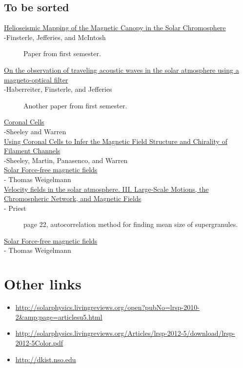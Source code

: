 \documentclass{article}
\begin{document}
\subsection{To be sorted}
\begin{description}
    \item [\href{http://adsabs.harvard.edu/abs/2004ApJ...613L.185F}
            {Helioseismic Mapping of the Magnetic Canopy in the Solar Chromosphere}\\
        -Finsterle, Jefferies, and McIntosh]
        Paper from first semester.
    \item [\href{http://cdsads.u-strasbg.fr/abs/2007AN....328..211H}
        {On the observation of traveling acoustic waves in the solar
            atmosphere using a magneto-optical filter}\\
        -Haberreiter, Finsterle, and Jefferies]
        Another paper from first semester.
	\item [\href{http://cdsads.u-strasbg.fr/abs/2012ApJ...749...40S}
        {Coronal Cells}\\
        -Sheeley and Warren]
	\item [\href{http://cdsads.u-strasbg.fr/abs/2013ApJ...772...88S}
        {Using Coronal Cells to Infer the Magnetic Field Structure and
            Chirality of Filament Channels}\\
        -Sheeley, Martin, Panasenco, and Warren]
    \item [\href{https://arxiv.org/abs/1208.4693}
        {Solar Force-free magnetic fields}\\
        - Thomas Weigelmann]
    \item [\href{http://cdsads.u-strasbg.fr/abs/1964ApJ...140.1120S}
        {Velocity fields in the solar atmosphere. III.
        Large-Scale Motions, the Chromospheric Network, and Magnetic Fields}\\
        - Priest]
        page 22, autocorrelation method for finding mean size of supergranules.
    \item [\href{https://arxiv.org/abs/1208.4693}
        {Solar Force-free magnetic fields}\\
        - Thomas Weigelmann]
\end{description}
\section{Other links}
\begin{itemize}
    \item \url{http://solarphysics.livingreviews.org/open?pubNo=lrsp-2010-2&amp;page=articlesu5.html}
    \item \url{http://solarphysics.livingreviews.org/Articles/lrsp-2012-5/download/lrsp-2012-5Color.pdf}
    \item \url{http://dkist.nso.edu}
\end{itemize}

%
\end{document}
